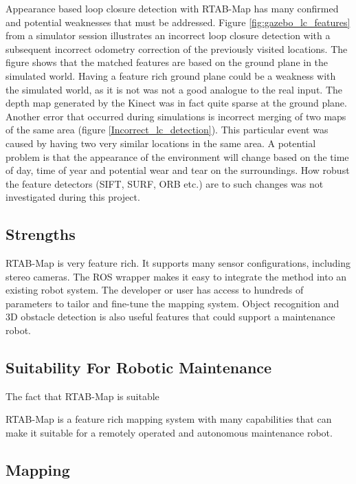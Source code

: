 Appearance based loop closure detection with \ac{RTAB-Map} has many confirmed and potential weaknesses that must be addressed. Figure \ref{fig:gazebo_lc_features} from a simulator session illustrates an incorrect loop closure detection with a subsequent incorrect odometry correction of the previously visited locations. The figure shows that the matched features are based on the ground plane in the simulated world. Having a feature rich ground plane could be a weakness with the simulated world, as it is not was not a good analogue to the real input. The depth map generated by the Kinect was in fact quite sparse at the ground plane. Another error that occurred during simulations is incorrect merging of two maps of the same area (figure \ref{Incorrect_lc_detection}). This particular event was caused by having two very similar locations in the same area. A potential problem is that the appearance of the environment will change based on the time of day, time of year and potential wear and tear on the surroundings. How robust the feature detectors (\ac{SIFT}, \ac{SURF}, \ac{ORB} etc.) are to such changes was not investigated during this project.

\subsection{Strengths}

\ac{RTAB-Map} is very feature rich. It supports many sensor configurations, including stereo cameras. The \ac{ROS} wrapper makes it easy to integrate the method into an existing robot system. The developer or user has access to hundreds of parameters to tailor and fine-tune the mapping system. Object recognition and 3D obstacle detection is also useful features that could support a maintenance robot.


\subsection{Suitability For Robotic Maintenance}

The fact that \ac{RTAB-Map} is suitable

\ac{RTAB-Map} is a feature rich mapping system with many capabilities that can make it suitable for a remotely operated and autonomous maintenance robot. 

\subsection{Mapping}

